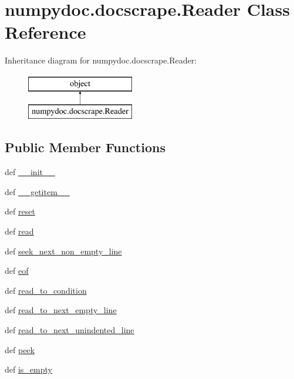 \hypertarget{classnumpydoc_1_1docscrape_1_1Reader}{}\section{numpydoc.\+docscrape.\+Reader Class Reference}
\label{classnumpydoc_1_1docscrape_1_1Reader}
Inheritance diagram for numpydoc.\+docscrape.\+Reader\+:\begin{figure}[H]
\begin{center}
\leavevmode
\includegraphics[height=2.000000cm]{classnumpydoc_1_1docscrape_1_1Reader}
\end{center}
\end{figure}
\subsection*{Public Member Functions}
\begin{DoxyCompactItemize}
\item 
def \hyperlink{classnumpydoc_1_1docscrape_1_1Reader_a0896c188357bc5522199b953c64f65f8}{\+\_\+\+\_\+init\+\_\+\+\_\+}
\item 
def \hyperlink{classnumpydoc_1_1docscrape_1_1Reader_ab5b6fa8e9ae783b9af4a995876ceb063}{\+\_\+\+\_\+getitem\+\_\+\+\_\+}
\item 
def \hyperlink{classnumpydoc_1_1docscrape_1_1Reader_a1c91bd6079659fbc9f500fc9d7214c30}{reset}
\item 
def \hyperlink{classnumpydoc_1_1docscrape_1_1Reader_a8b8551d4e3b15908f557b932c6c5ee1f}{read}
\item 
def \hyperlink{classnumpydoc_1_1docscrape_1_1Reader_ae65f89b07f75d59e4962b9e3bd64e82e}{seek\+\_\+next\+\_\+non\+\_\+empty\+\_\+line}
\item 
def \hyperlink{classnumpydoc_1_1docscrape_1_1Reader_aa9ff7a11a30d87b53ea57b51814535e7}{eof}
\item 
def \hyperlink{classnumpydoc_1_1docscrape_1_1Reader_ac1d601dd4ba62289dbd182651097963f}{read\+\_\+to\+\_\+condition}
\item 
def \hyperlink{classnumpydoc_1_1docscrape_1_1Reader_a9e348f1f4e4fd8a2cac84cde1d8aab1d}{read\+\_\+to\+\_\+next\+\_\+empty\+\_\+line}
\item 
def \hyperlink{classnumpydoc_1_1docscrape_1_1Reader_ad62464cd61c4a64ac74efe8ec869ec48}{read\+\_\+to\+\_\+next\+\_\+unindented\+\_\+line}
\item 
def \hyperlink{classnumpydoc_1_1docscrape_1_1Reader_aa618d223de1ea0b1af9ec2970034fdfc}{peek}
\item 
def \hyperlink{classnumpydoc_1_1docscrape_1_1Reader_afbbdbe788014c6633127877ca7f96a8d}{is\+\_\+empty}
\end{DoxyCompactItemize}


